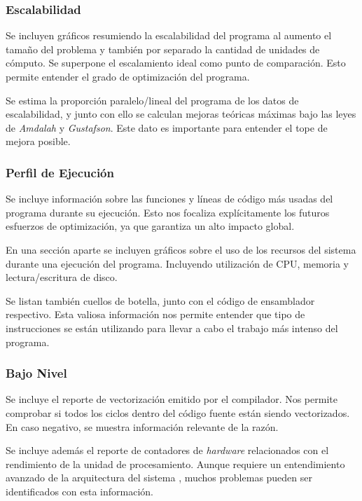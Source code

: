 \documentclass[a4paper]{report}
\begin{document}
\subsubsection{Escalabilidad}

Se incluyen gráficos resumiendo la escalabilidad del programa al aumento el tamaño del problema y también por separado la cantidad de unidades de cómputo. 
Se superpone el escalamiento ideal como punto de comparación. Esto permite entender el grado de optimización del programa.

\bigskip

Se estima la proporción paralelo/lineal del programa de los datos de escalabilidad, y junto con ello se calculan mejoras teóricas máximas bajo las leyes de {\it Amdalah} y {\it Gustafson}.
Este dato es importante para entender el tope de mejora posible.

\subsubsection{Perfil de Ejecución}

Se incluye información sobre las funciones y líneas de código más usadas del programa durante su ejecución. 
Esto nos focaliza explícitamente los futuros esfuerzos de optimización, ya que garantiza un alto impacto global.

\bigskip

En una sección aparte se incluyen gráficos sobre el uso de los recursos del sistema durante una ejecución del programa. Incluyendo utilización de CPU, memoria y lectura/escritura de disco.

\bigskip

Se listan también cuellos de botella, junto con el código de ensamblador respectivo. Esta valiosa información nos permite entender que tipo de instrucciones se están utilizando para llevar a cabo el trabajo más intenso del programa.

\subsubsection{Bajo Nivel}

Se incluye el reporte de vectorización emitido por el compilador. Nos permite comprobar si todos los ciclos dentro del código fuente están siendo vectorizados. 
En caso negativo, se muestra información relevante de la razón.

\bigskip

Se incluye además el reporte de contadores de {\it hardware} relacionados con el rendimiento de la unidad de procesamiento. 
Aunque requiere un entendimiento avanzado de la arquitectura del sistema \cite{hennessy}, muchos problemas pueden ser identificados con esta información.
\end{document}
